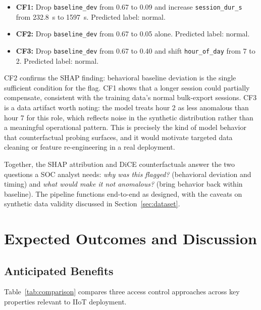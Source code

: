 \documentclass[conference]{IEEEtran}
\begin{document}
\begin{itemize}
  \item \textbf{CF1:} Drop \texttt{baseline\_dev} from 0.67 to 0.09 and increase \texttt{session\_dur\_s} from 232.8~s to 1597~s. Predicted label: normal.
  \item \textbf{CF2:} Drop \texttt{baseline\_dev} from 0.67 to 0.05 alone. Predicted label: normal.
  \item \textbf{CF3:} Drop \texttt{baseline\_dev} from 0.67 to 0.40 and shift \texttt{hour\_of\_day} from 7 to 2. Predicted label: normal.
\end{itemize}

CF2 confirms the SHAP finding: behavioral baseline deviation is the single sufficient condition for the flag. CF1 shows that a longer session could partially compensate, consistent with the training data's normal bulk-export sessions. CF3 is a data artifact worth noting: the model treats hour 2 as less anomalous than hour 7 for this role, which reflects noise in the synthetic distribution rather than a meaningful operational pattern. This is precisely the kind of model behavior that counterfactual probing surfaces, and it would motivate targeted data cleaning or feature re-engineering in a real deployment.

Together, the SHAP attribution and DiCE counterfactuals answer the two questions a SOC analyst needs: \textit{why was this flagged?} (behavioral deviation and timing) and \textit{what would make it not anomalous?} (bring behavior back within baseline). The pipeline functions end-to-end as designed, with the caveats on synthetic data validity discussed in Section~\ref{sec:dataset}.

\section{Expected Outcomes and Discussion}

\subsection{Anticipated Benefits}

Table~\ref{tab:comparison} compares three access control approaches across key properties relevant to IIoT deployment.
\end{document}
